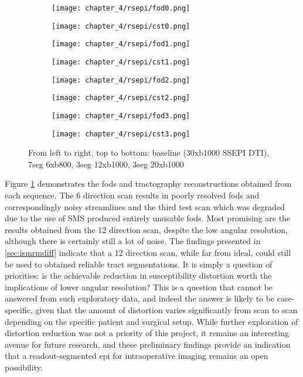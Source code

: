 \begin{figure}[h!]
  \begin{subfigure}{0.22\textwidth}
    \texttt{[image: chapter\_4/rsepi/fod0.png]}
  \end{subfigure}%
  \begin{subfigure}{0.22\textwidth}
    \texttt{[image: chapter\_4/rsepi/cst0.png]}
  \end{subfigure}
  \begin{subfigure}{0.22\textwidth}
    \texttt{[image: chapter\_4/rsepi/fod1.png]}
  \end{subfigure}%
  \begin{subfigure}{0.22\textwidth}
    \texttt{[image: chapter\_4/rsepi/cst1.png]}
  \end{subfigure}
  \begin{subfigure}{0.22\textwidth}
    \texttt{[image: chapter\_4/rsepi/fod2.png]}
  \end{subfigure}%
  \begin{subfigure}{0.22\textwidth}
    \texttt{[image: chapter\_4/rsepi/cst2.png]}
  \end{subfigure}
  \begin{subfigure}{0.22\textwidth}
    \texttt{[image: chapter\_4/rsepi/fod3.png]}
  \end{subfigure}%
  \begin{subfigure}{0.22\textwidth}
    \texttt{[image: chapter\_4/rsepi/cst3.png]}
  \end{subfigure}
  \caption{From left to right, top to bottom: baseline (30xb1000 SSEPI DTI), 7seg 6xb800, 3seg 12xb1000, 3seg 20xb1000}
  \label{fig:rsepi-fod}
\end{figure}

Figure \ref{fig:rsepi-fod} demonstrates the \glspl{fod} and tractography reconstructions obtained from each sequence.
The 6 direction scan results in poorly resolved \glspl{fod} and correspondingly noisy streamlines and the third test scan which was degraded due to the use of SMS produced entirely unusable \glspl{fod}.
Most promising are the results obtained from the 12 direction scan, despite the low angular resolution, although there is certainly still a lot of noise.
The findings presented in \ref{sec:ismrmdiff} indicate that a 12 direction scan, while far from ideal, could still be used to obtained reliable tract segmentations.
It is simply a question of priorities: is the achievable reduction in susceptibility distortion worth the implications of lower angular resolution?
This is a question that cannot be answered from such exploratory data, and indeed the answer is likely to be case-specific, given that the amount of distortion varies significantly from scan to scan depending on the specific patient and surgical setup.
While further exploration of distortion reduction was not a priority of this project, it remains an interesting avenue for future research, and these preliminary findings provide an indication that a readout-segmented \gls{epi} for intraoperative imaging remains an open possibility.
